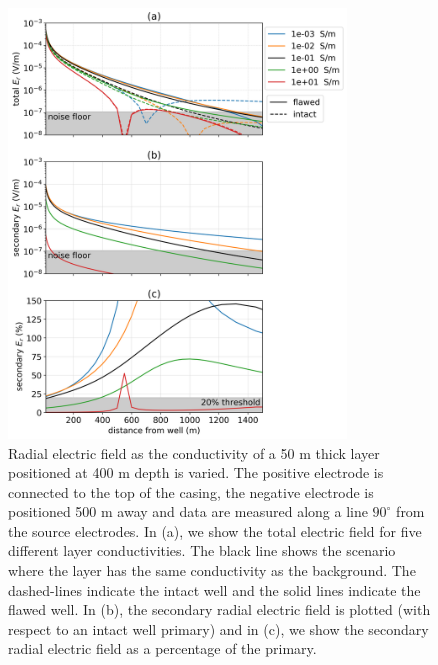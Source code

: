 \begin{figure}
    \begin{center}
    \includegraphics[width=0.8\textwidth]{figures/integrity_layer.png}
    \end{center}
\caption{
    Radial electric field as the conductivity of a 50 m thick layer positioned at 400 m depth is varied.
    The positive electrode is connected to the top of the casing, the negative electrode
    is positioned 500 m away and data are measured along a line $90^\circ$ from the
    source electrodes. In (a), we show the total electric field for five different layer conductivities.
    The black line shows the scenario where the layer has the same conductivity as the background.
    The dashed-lines indicate the intact well and the solid lines indicate the flawed well.
    In (b), the secondary radial electric field is plotted (with respect to an intact well primary)
    and in (c), we show the
    secondary radial electric field as a percentage of the primary.
}
\label{fig:integrity_layer}
\end{figure}

